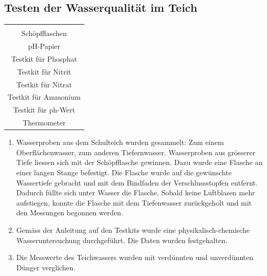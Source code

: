 \documentclass{article}
\begin{document}
    \subsection{Testen der Wasserqualität im Teich}
    
        \begin{table}[h!]
        \centering
        \begin{tabular}{|c|} 
         \hline
         \\
         Schöpfflaschen \\
         pH-Papier \\
         Testkit für Phosphat \\
         Testkit für Nitrit \\
         Testkit für Nitrat \\
         Testkit für Ammonium \\
         Testkit für ph-Wert \\
         Thermometer \\[1ex]
         \hline
        \end{tabular}
        \label{Praktikum1}
        \end{table}
        
        \begin{enumerate}
            \item Wasserproben aus dem Schulteich wurden gesammelt: Zum einem Oberflächenwasser, zum anderen Tiefernwasser. Wasserproben aus grösserer Tiefe liessen sich mit der Schöpfflasche gewinnen. Dazu wurde eine Flasche an einer langen Stange befestigt. Die Flasche wurde auf die gewünschte Wassertiefe gebracht und mit dem Bindfaden der Verschlussstopfen entfernt. Dadurch füllte sich unter Wasser die Flasche. Sobald keine Luftblasen mehr aufstiegen, konnte die Flasche mit dem Tiefenwasser zurückgeholt und mit den Messungen begonnen werden.
            \item Gemäss der Anleitung auf den Testkits wurde eine physikalisch-chemische Wasseruntersuchung durchgeführt. Die Daten wurden festgehalten.
            \item Die Messwerte des Teichwassers wurden mit verdünnten und unverdünnten Dünger verglichen.
        \end{enumerate}
        
\end{document}

